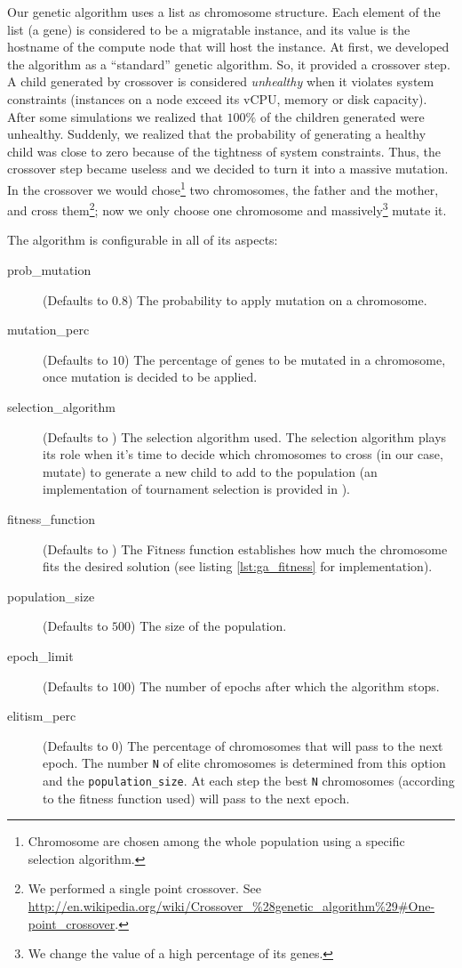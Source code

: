 Our genetic algorithm uses a list as chromosome structure. Each element of the list (a gene) is considered to be a migratable instance, and its value is the hostname of the compute node that will host the instance. At first, we developed the algorithm as a ``standard'' genetic algorithm. So, it provided a crossover step. A child generated by crossover is considered \emph{unhealthy} when it violates system constraints (instances on a node exceed its vCPU, memory or disk capacity). After some simulations we realized that $100\%$ of the children generated were unhealthy. Suddenly, we realized that the probability of generating a healthy child was close to zero because of the tightness of system constraints. Thus, the crossover step became useless and we decided to turn it into a massive mutation. In the crossover we would chose\footnote{Chromosome are chosen among the whole population using a specific selection algorithm.} two chromosomes, the father and the mother, and cross them\footnote{We performed a single point crossover. See \url{http://en.wikipedia.org/wiki/Crossover\_\%28genetic\_algorithm\%29\#One-point\_crossover}.}; now we only choose one chromosome and massively\footnote{We change the value of a high percentage of its genes.} mutate it.

The algorithm is configurable in all of its aspects:
\begin{description}
	\item[prob\_mutation] (Defaults to $0.8$) The probability to apply mutation on a chromosome.
	\item[mutation\_perc] (Defaults to $10$) The percentage of genes to be mutated in a chromosome, once mutation is decided to be applied.
	\item[selection\_algorithm] (Defaults to ) The selection algorithm used. The selection algorithm plays its role when it's time to decide which chromosomes to cross (in our case, mutate) to generate a new child to add to the population (an implementation of tournament selection is provided in ).
	\item[fitness\_function] (Defaults to ) The Fitness function establishes how much the chromosome fits the desired solution (see listing \ref{lst:ga_fitness} for  implementation).
	\item[population\_size] (Defaults to $500$) The size of the population.
	\item[epoch\_limit] (Defaults to $100$) The number of epochs after which the algorithm stops.
	\item[elitism\_perc] (Defaults to $0$) The percentage of chromosomes that will pass to the next epoch. The number \texttt{N} of elite chromosomes is determined from this option and the \texttt{population\_size}. At each step the best \texttt{N} chromosomes (according to the fitness function used) will pass to the next epoch.
\end{description}


